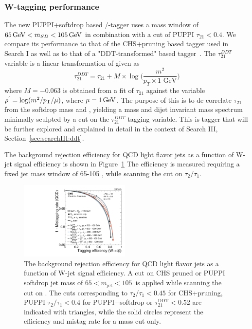 \subsubsection{W-tagging performance}
The new PUPPI+softdrop based \PW/\PZ-tagger uses a mass window of $65 \,\text{Ge\hspace{-.08em}V} < m_{SD} < 105 \,\text{Ge\hspace{-.08em}V}$ in combination with a cut of PUPPI $\tau_{21}<0.4$.
We compare its performance to that of the CHS+pruning based tagger used in Search I as well as to that of a "DDT-transformed" \nsubj based tagger~\cite{Dolen:2016kst}. The $\tau_{21}^{DDT}$ variable is a linear transformation of \nsubj given as
\begin{equation}
\label{eq:searchII:ddt}
\tau_{21}^{DDT} = \tau_{21} + M \times \log \bigg( \frac{m^2}{p_T \times 1 \textrm{ GeV}}\bigg)
\end{equation}
where $M=-0.063$ is obtained from a fit of $\tau_{21}$ against the variable $\rho^{'}=\log(m^2/p_{\mathrm{T}}/\mu)$, where $\mu = 1 \,\text{Ge\hspace{-.08em}V}$.
The purpose of this is to de-correlate $\tau_{21}$ from the softdrop mass and \PT, yielding a mass and dijet invariant mass spectrum minimally sculpted by
a cut on the $\tau_{21}^{DDT}$ tagging variable. This is tagger that will be further explored and explained in detail in the context of Search III, Section~\ref{sec:searchIII:ddt}.\par
The background rejection efficiency for QCD light flavor jets as a function of W-jet signal efficiency is shown in Figure~\ref{fig:searchII:roc}
The efficiency is measured requiring a fixed jet mass window of 65-105 \GeV, while scanning the cut on $\tau_2/\tau_1$.
\begin{figure}[h!]
\centering
\includegraphics[width=0.49\textwidth]{figures/vtagging/JME-16-003/BoostedW/roc_WqqvsQCD_2bins.pdf}
\caption{The background rejection efficiency for QCD light flavor jets as a function of W-jet signal efficiency. A cut on CHS pruned or PUPPI softdrop jet
mass of $65<m_{\mathrm{jet}}<105$~\GeV is applied while scanning the cut on \nsubj. The cuts corresponding to $\tau_2/\tau_1 < 0.45$ for CHS+pruning, PUPPI $\tau_2/\tau_1 < 0.4$ for PUPPI+softdrop or $\tau_{21}^\text{DDT}<0.52$ are indicated with triangles, while the solid circles represent the efficiency and mistag rate for a mass cut only.}
\label{fig:searchII:roc}
\end{figure}
